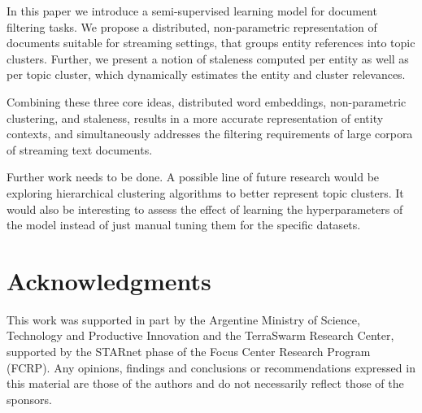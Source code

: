 \documentclass{article}
\begin{document}
In this paper we introduce a semi-supervised learning model for document filtering tasks. We propose a distributed, non-parametric representation of documents suitable for streaming settings, that groups entity references into topic clusters. Further, we present a notion of staleness computed per entity as well as per topic cluster, which dynamically estimates the entity and cluster relevances.

Combining these three core ideas, distributed word embeddings, non-parametric clustering, and staleness, results in a more accurate representation of entity contexts, and simultaneously addresses the filtering requirements of large corpora of streaming text documents.

Further work needs to be done. A possible line of future research would be exploring hierarchical clustering algorithms to better represent topic clusters. It would also be interesting to assess the effect of learning the hyperparameters of the model instead of just manual tuning them for the specific datasets.

\section*{Acknowledgments} 
 
This work was supported in part by the Argentine Ministry of Science, Technology and Productive Innovation and the TerraSwarm Research Center, supported by the STARnet phase of the Focus Center Research Program (FCRP). Any opinions, findings and conclusions or recommendations expressed in this material are those of the authors and do not necessarily reflect those of the sponsors.



\end{document}

